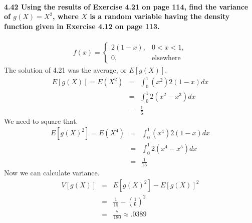 \documentclass{article}
\begin{document}
\paragraph{4.42 Using the results of Exercise 4.21 on page 114, find the 
variance of $g(X)=X^2$, where $X$ is a random variable having the density 
function given in Exercise 4.12 on page 113.}
\begin{eqnarray*}
f(x)=\left\{\begin{array}{ll}
	2(1-x), & 0<x<1,\\
	0, & \mbox{elsewhere}
	\end{array}\right.
\end{eqnarray*}
The solution of 4.21 was the average, or $E[g(X)]$.
\begin{eqnarray*}
E[g(X)] = E(X^2) & = & \int_0^1 (x^2)2(1-x)dx\\
	& = & \int_0^1 2(x^2-x^3)dx\\
	& = & \frac{1}{6}
\end{eqnarray*}
We need to square that.
\begin{eqnarray*}
E[g(X)^2] = E(X^4) & = & \int_0^1 (x^4)2(1-x)dx\\
	& = & \int_0^1 2(x^4-x^5)dx\\
	& = & \frac{1}{15}
\end{eqnarray*}
Now we can calculate variance.
\begin{eqnarray*}
V[g(X)] & = & E[g(X)^2]-E[g(X)]^2\\
	& = & \frac{1}{15}-\left(\frac{1}{6}\right)^2\\
	& = & \boxed{\frac{7}{180} \approx .0389}
\end{eqnarray*}

\end{document}
